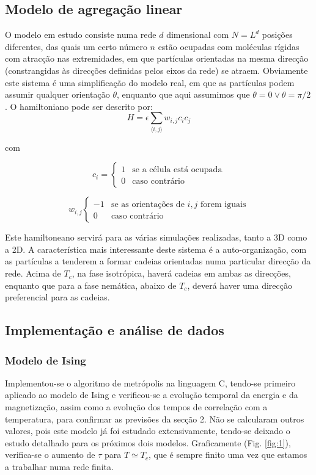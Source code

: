 \documentclass[a4paper,10pt]{article}
\begin{document}
\begin{multicols}{2}
\subsection{Modelo de agregação linear}
O modelo em estudo consiste numa rede $d$ dimensional com $N=L^d$ posições diferentes, das quais um certo número $n$ estão ocupadas com moléculas rígidas com atracção nas extremidades, em que partículas orientadas na mesma direcção (constrangidas às direcções definidas pelos eixos da rede) se atraem. Obviamente este sistema é uma simplificação do modelo real, em que as partículas podem assumir qualquer orientação $\theta$, enquanto que aqui assumimos que $\theta = 0 \vee \theta = \pi/2$. O hamiltoniano pode ser descrito\cite{lopez-2009} por:
\begin{equation}
	H = \epsilon\sum_{\langle i,j \rangle} w_{i,j} c_i c_j
\end{equation}

com

\small
\begin{equation}
c_i=
\begin{cases}
1&\text{se a célula está ocupada}\\
0&\text{caso contrário}
\end{cases}
\end{equation}

\begin{equation}
w_{i,j}
\begin{cases}
-1&\text{se as orientações de $i,j$ forem iguais}\\
0&\text{caso contrário}
\end{cases}
\end{equation}
\normalsize

Este hamiltoneano servirá para as várias simulações realizadas, tanto a 3D como a 2D. A característica mais interessante deste sistema é a auto-organização, com as partículas a tenderem a formar cadeias orientadas numa particular direcção da rede. Acima de $T_c$, na fase isotrópica, haverá cadeias em ambas as direcções, enquanto que para a fase nemática, abaixo de $T_c$, deverá haver uma direcção preferencial para as cadeias.

\subsection{Implementação e análise de dados}
\subsubsection{Modelo de Ising}
Implementou-se o algoritmo de metrópolis na linguagem C, tendo-se primeiro aplicado ao modelo de Ising e verificou-se a evolução temporal da energia e da magnetização, assim como a evolução dos tempos de correlação com a temperatura, para confirmar as previsões da secção 2. Não se calcularam outros valores, pois este modelo já foi estudado extensivamente, tendo-se deixado o estudo detalhado para os próximos dois modelos. Graficamente (Fig. \ref{fig:1}), verifica-se o aumento de $\tau$ para $T\simeq T_c$, que é sempre finito uma vez que estamos a trabalhar numa rede finita.


\end{multicols}
\end{document}
